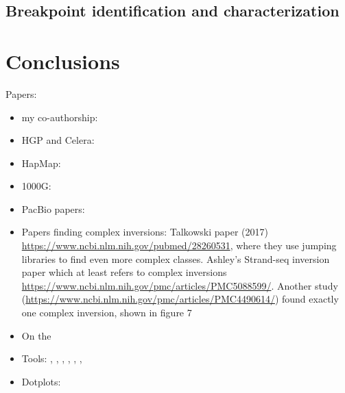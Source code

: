 \subsection{Breakpoint identification and characterization}
\label{sec:maze_breakpoints}





\section{Conclusions}









Papers:
\begin{itemize}
\item my co-authorship: \citep{Sudmant2015}
\item HGP and Celera: \citep{Lander2001,Venter2001}
\item HapMap: \citep{InternationalHapMapConsortium2005,Frazer2007,Altshuler2010}
\item 1000G: \citep{Durbin2010,1000GenomesProjectConsortium2012,Auton2015}
\item PacBio papers: \citep{Chaisson2014,Pendleton2015}
\item Papers finding complex inversions: Talkowski paper (2017)
    \url{https://www.ncbi.nlm.nih.gov/pubmed/28260531}, where they use jumping
    libraries to find even more complex classes. Ashley's Strand-seq inversion
    paper which at least refers to complex inversions
    \url{https://www.ncbi.nlm.nih.gov/pmc/articles/PMC5088599/}. Another study
    (\url{https://www.ncbi.nlm.nih.gov/pmc/articles/PMC4490614/}) found exactly
    one complex inversion, shown in figure 7
\item On the

\item Tools: \blasr, \last, \mummer, \bwamem, \quiver, \celeraassembler, \maze
\item Dotplots: \citep{Fitch1969,Gibbs1970}
\end{itemize}
